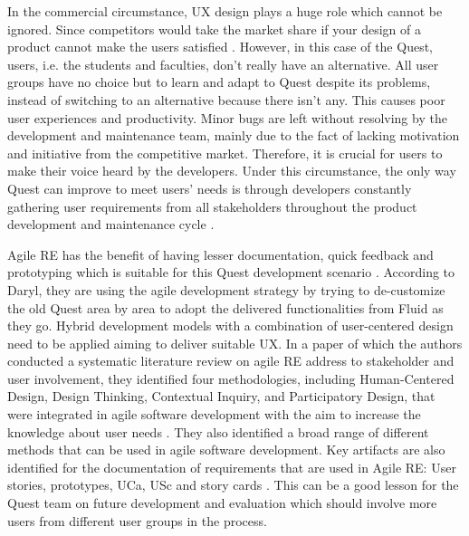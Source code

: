 \documentclass[conference]{IEEEtran}
\begin{document}
In the commercial circumstance, UX design plays a huge role which cannot be ignored. Since competitors would take the market share if your design of a product cannot make the users satisfied \cite{b17}. However, in this case of the Quest, users, i.e. the students and faculties, don't really have an alternative. All user groups have no choice but to learn and adapt to Quest despite its problems, instead of switching to an alternative because there isn't any. This causes poor user experiences and productivity. Minor bugs are left without resolving by the development and maintenance team, mainly due to the fact of lacking motivation and initiative from the competitive market. Therefore, it is crucial for users to make their voice heard by the developers. Under this circumstance, the only way Quest can improve to meet users' needs is through developers constantly gathering user requirements from all stakeholders throughout the product development and maintenance cycle \cite{b17}. 

Agile RE has the benefit of having lesser documentation, quick feedback and prototyping which is suitable for this Quest development scenario \cite{b18}. According to Daryl, they are using the agile development strategy by trying to de-customize the old Quest area by area to adopt the delivered functionalities from Fluid as they go. Hybrid development models with a combination of user-centered design need to be applied aiming to deliver suitable UX. In a paper of which the authors conducted a systematic literature review on agile RE address to stakeholder and user involvement, they identified four methodologies, including Human-Centered Design, Design Thinking, Contextual Inquiry, and Participatory Design, that were integrated in agile software development with the aim to increase the knowledge about user needs \cite{b19}. They also identified a broad range of different methods that can be used in agile software development. Key artifacts are also identified for the documentation of requirements that are used in Agile RE: User stories, prototypes, UCa, USc and story cards \cite{b19}. This can be a good lesson for the Quest team on future development and evaluation which should involve more users from different user groups in the process. 
\end{document}

